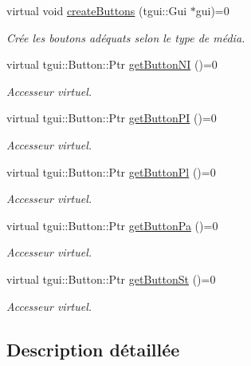 \begin{DoxyCompactItemize}
\item 
virtual void \hyperlink{classButtons_a785133d78116a4455166af0419f8283c}{create\+Buttons} (tgui\+::\+Gui $\ast$gui)=0
\begin{DoxyCompactList}\small\item\em Crée les boutons adéquats selon le type de média. \end{DoxyCompactList}\item 
virtual tgui\+::\+Button\+::\+Ptr \hyperlink{classButtons_a12154e1ff630b800dd9d5193e97202a0}{get\+Button\+N\+I} ()=0
\begin{DoxyCompactList}\small\item\em Accesseur virtuel. \end{DoxyCompactList}\item 
virtual tgui\+::\+Button\+::\+Ptr \hyperlink{classButtons_a82e85c87c04ead2f4bfbe661787e8094}{get\+Button\+P\+I} ()=0
\begin{DoxyCompactList}\small\item\em Accesseur virtuel. \end{DoxyCompactList}\item 
virtual tgui\+::\+Button\+::\+Ptr \hyperlink{classButtons_aea3bd52fcd2c6b41d71a02fb923be3c7}{get\+Button\+Pl} ()=0
\begin{DoxyCompactList}\small\item\em Accesseur virtuel. \end{DoxyCompactList}\item 
virtual tgui\+::\+Button\+::\+Ptr \hyperlink{classButtons_ab1fa18621507e31f3c6a66aaac91d065}{get\+Button\+Pa} ()=0
\begin{DoxyCompactList}\small\item\em Accesseur virtuel. \end{DoxyCompactList}\item 
virtual tgui\+::\+Button\+::\+Ptr \hyperlink{classButtons_a2e03184bee5b70e8acb1f53c98632350}{get\+Button\+St} ()=0
\begin{DoxyCompactList}\small\item\em Accesseur virtuel. \end{DoxyCompactList}\end{DoxyCompactItemize}


\subsection{Description détaillée}



